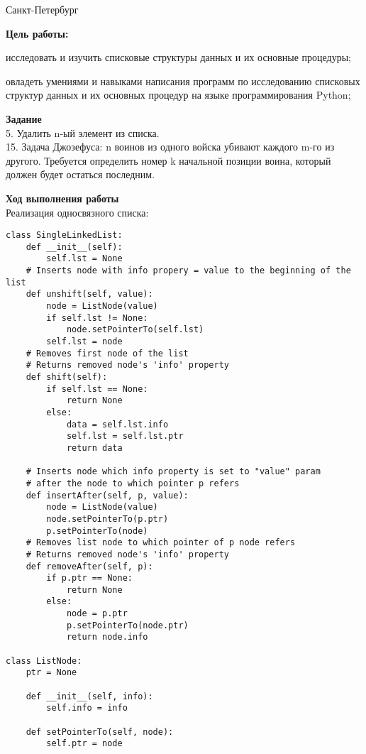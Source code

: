 \documentclass[12pt]{article}
\begin{document}
\par\bigskip\par\bigskip\par\bigskip\par\bigskip\par\bigskip\par\bigskip\par\bigskip\par\bigskip
\begin{center}
Санкт-Петербург
\par{}
\end{center}
\pagebreak
\textbf{ Цель работы:}
\begin{list}{-}{}
\item исследовать и изучить списковые структуры данных и их основные процедуры;
\item овладеть умениями и навыками написания программ по исследованию списковых структур
данных и их основных процедур на языке программирования Python;
\end{list}

\textbf{Задание} \\

5. Удалить n-ый элемент из списка.\\
15. Задача Джозефуса: n воинов из одного войска убивают каждого m-го из другого.
Требуется определить номер k начальной позиции воина, который должен будет остаться
последним. \\
\par
\textbf{Ход выполнения работы}\\

Реализация односвязного списка:
\begin{verbatim}
class SingleLinkedList:
	def __init__(self):
		self.lst = None
	# Inserts node with info propery = value to the beginning of the list
	def unshift(self, value):
		node = ListNode(value)
		if self.lst != None:
			node.setPointerTo(self.lst)
		self.lst = node
	# Removes first node of the list
	# Returns removed node's 'info' property
	def shift(self):
		if self.lst == None:
			return None
		else:
			data = self.lst.info
			self.lst = self.lst.ptr
			return data 

	# Inserts node which info property is set to "value" param
	# after the node to which pointer p refers
	def insertAfter(self, p, value):
		node = ListNode(value)
		node.setPointerTo(p.ptr)
		p.setPointerTo(node)
	# Removes list node to which pointer of p node refers
	# Returns removed node's 'info' property
	def removeAfter(self, p):
		if p.ptr == None:
			return None
		else:
			node = p.ptr
			p.setPointerTo(node.ptr)
			return node.info
			
class ListNode:
	ptr = None

	def __init__(self, info):
		self.info = info
	
	def setPointerTo(self, node):
		self.ptr = node
\end{verbatim}
\end{document}
